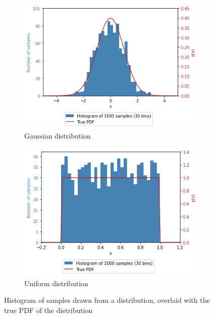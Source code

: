 \documentclass[a4paper]{article}
\begin{document}
\begin{figure}[h]
    \centering
    \begin{subfigure}[b]{0.45\textwidth}
        \centering
        \includegraphics[width=\textwidth]{figures/gaussian_histogram_and_pdf.png}
        \caption{Gaussian distribution}
        \label{fig:gaussian_histogram_and_pdf}
    \end{subfigure}
    \hfill
    \begin{subfigure}[b]{0.45\textwidth}
        \centering
        \includegraphics[width=\textwidth]{figures/uniform_histogram_and_pdf.png}
        \caption{Uniform distribution}
        \label{fig:uniform_histogram_and_pdf}
    \end{subfigure}
    \caption{Histogram of samples drawn from a distribution, overlaid with the true PDF of the distribution}
    \label{fig:histogram_and_pdf}
\end{figure}
\end{document}
